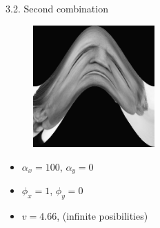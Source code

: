 \documentclass[xcolor={x11names,svgnames,dvipsnames},trans]{beamer}
\begin{document}
\begin{frame}{3.2. Second combination}

    \begin{center}
        \begin{minipage}{.8\textwidth}\rmfamily
            \begin{figure}
                \includegraphics[width=4.666cm]{images/warps/combination_2.png}
            \end{figure}
            \begin{itemize}
                \item $\alpha_x = 100$, $\alpha_y = 0$
                \item $\phi_x = 1$, $\phi_y = 0$
                \item $v = 4.66$, (infinite posibilities)
            \end{itemize}
       \end{minipage}
    \end{center}

\end{frame}
\end{document}
